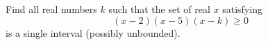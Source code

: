 Find all real numbers $k$ such that the set of real $x$ satisfying
\[
(x-2)(x-5)(x-k)\ge0
\]
is a single interval (possibly unbounded).
